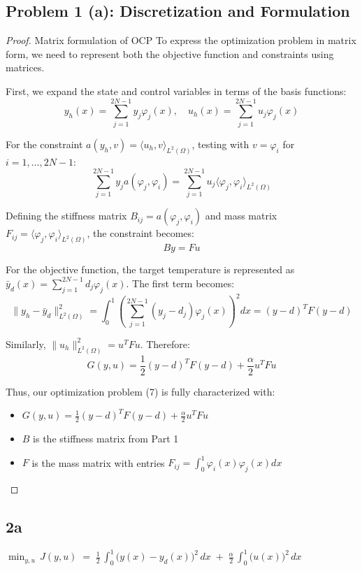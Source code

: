 \documentclass[a4paper,10pt]{article}
\begin{document}
\subsection*{Problem 1 (a): Discretization and Formulation}
\begin{proof}{Matrix formulation of OCP}{}
To express the optimization problem in matrix form, we need to represent both the objective function and constraints using matrices.

First, we expand the state and control variables in terms of the basis functions:
\[
y_h(x) = \sum_{j=1}^{2N-1} y_j \varphi_j(x), \quad 
u_h(x) = \sum_{j=1}^{2N-1} u_j \varphi_j(x)
\]

For the constraint \(a(y_h,v) = \langle u_h,v \rangle_{L^2(\Omega)}\), testing with \(v = \varphi_i\) for \(i=1,\dots,2N-1\):
\[
\sum_{j=1}^{2N-1} y_j a(\varphi_j,\varphi_i) = \sum_{j=1}^{2N-1} u_j \langle \varphi_j,\varphi_i \rangle_{L^2(\Omega)}
\]

Defining the stiffness matrix \(B_{ij} = a(\varphi_j,\varphi_i)\) and mass matrix \(F_{ij} = \langle \varphi_j,\varphi_i \rangle_{L^2(\Omega)}\), the constraint becomes:
\[
By = Fu
\]

For the objective function, the target temperature is represented as \(\bar{y}_d(x) = \sum_{j=1}^{2N-1} d_j \varphi_j(x)\). The first term becomes:
\[
\|y_h - \bar{y}_d\|^2_{L^2(\Omega)} = \int_0^1 \left(\sum_{j=1}^{2N-1} (y_j-d_j)\varphi_j(x)\right)^2 dx = (y-d)^T F (y-d)
\]

Similarly, \(\|u_h\|^2_{L^2(\Omega)} = u^T F u\). Therefore:
\[
G(y,u) = \frac{1}{2}(y-d)^T F (y-d) + \frac{\alpha}{2}u^T F u
\]

Thus, our optimization problem (7) is fully characterized with:
\begin{itemize}
\item \(G(y,u) = \frac{1}{2}(y-d)^T F (y-d) + \frac{\alpha}{2}u^T F u\)
\item \(B\) is the stiffness matrix from Part 1
\item \(F\) is the mass matrix with entries \(F_{ij} = \int_0^1 \varphi_i(x)\varphi_j(x)dx\)
\end{itemize}
\end{proof}



\subsection{2a}

\noindent
$\displaystyle
\min_{y,u}\,J(y,u)
\;=\;
\tfrac12\,\int_{0}^{1}\bigl(y(x)-y_{d}(x)\bigr)^{2}\,dx
\;+\;\tfrac{\alpha}{2}\,\int_{0}^{1}\bigl(u(x)\bigr)^{2}\,dx
$
\end{document}
